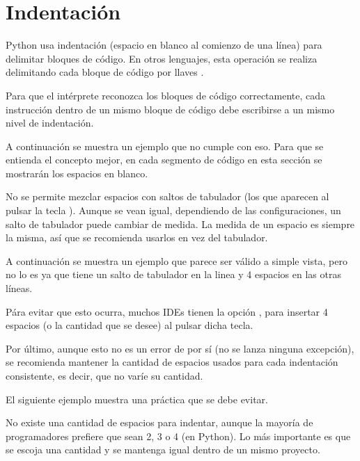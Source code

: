 
\section{Indentación}

Python usa indentación (espacio en blanco al comienzo de una línea) para delimitar bloques de código.
En otros lenguajes, esta operación se realiza delimitando cada bloque de código por llaves \ttt{\{\}}.

Para que el intérprete reconozca los bloques de código correctamente, cada instrucción dentro de un mismo bloque de código debe escribirse a un mismo nivel de indentación.

A continuación se muestra un ejemplo que no cumple con eso.
Para que se entienda el concepto mejor, en cada segmento de código en esta sección se mostrarán los espacios en blanco.


No se permite mezclar espacios con saltos de tabulador (los que aparecen al pulsar la tecla ).
Aunque se vean igual, dependiendo de las configuraciones, un salto de tabulador puede cambiar de medida.
La medida de un espacio es siempre la misma, así que se recomienda usarlos en vez del tabulador.

A continuación se muestra un ejemplo que parece ser válido a simple vista, pero no lo es ya que tiene un salto de tabulador en la linea  y 4 espacios en las otras líneas.


Pára evitar que esto ocurra, muchos IDEs tienen la opción , para insertar 4 espacios (o la cantidad que se desee) al pulsar dicha tecla.

Por último, aunque esto no es un error de por sí (no se lanza ninguna excepción), se recomienda mantener la cantidad de espacios usados para cada indentación consistente, es decir, que no varíe su cantidad.

El siguiente ejemplo muestra una práctica que se debe evitar.


No existe una cantidad  de espacios para indentar, aunque la mayoría de programadores prefiere que sean 2, 3 o 4 (en Python).
Lo más importante es que se escoja una cantidad y se mantenga igual dentro de un mismo proyecto.


